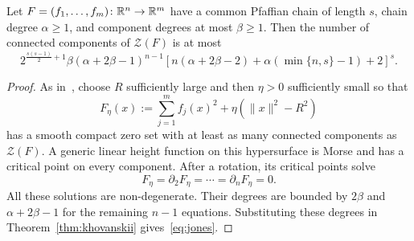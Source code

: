 \begin{corollary}\label{cor:pfaffian-components}
Let $F=(f_1,\dots,f_m)\colon\mathbb{R}^n\to\mathbb{R}^m$ have a common Pfaffian chain of length $s$, chain degree $\alpha\ge1$, and component degrees at most $\beta\ge1$. Then the number of connected components of $\mathcal Z(F)$ is at most
\begin{equation}\label{eq:jones}
2^{\frac{s(s-1)}2+1}\beta(\alpha+2\beta-1)^{n-1}
\left[n(\alpha+2\beta-2)+\alpha(\min\{n,s\}-1)+2\right]^s.
\end{equation}
\end{corollary}

\begin{proof}
As in~\cite[Corollary 3.3]{gabrielov2004complexity}, choose $R$ sufficiently large and then $\eta>0$ sufficiently small so that
\[
F_\eta(x):=\sum_{j=1}^m f_j(x)^2+\eta(\|x\|^2-R^2)
\]
has a smooth compact zero set with at least as many connected components as $\mathcal Z(F)$. A generic linear height function on this hypersurface is Morse and has a critical point on every component. After a rotation, its critical points solve
\[
F_\eta=\partial_2 F_\eta=\cdots=\partial_n F_\eta=0.
\]
All these solutions are non-degenerate. Their degrees are bounded by $2\beta$ and $\alpha+2\beta-1$ for the remaining $n-1$ equations. Substituting these degrees in Theorem~\ref{thm:khovanskii} gives~\eqref{eq:jones}.
\end{proof}
